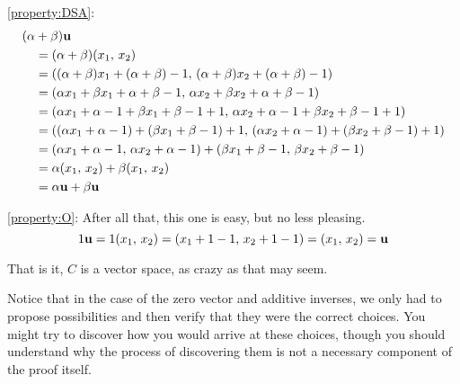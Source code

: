 \documentclass{ximera}
\begin{document}
\begin{example}
\ref{property:DSA}:
\begin{align*}
(\alpha&+\beta)\mathbf{u}\\
&=(\alpha+\beta)(x_1,\,x_2)\\
&=((\alpha+\beta)x_1+(\alpha+\beta)-1,\,(\alpha+\beta)x_2+(\alpha+\beta)-1)\\
&=(\alpha x_1+\beta x_1+\alpha+\beta-1,\,\alpha x_2+\beta x_2+\alpha+\beta-1)\\
&=(\alpha x_1+\alpha-1+\beta x_1+\beta-1+1,\,\alpha x_2+\alpha-1+\beta x_2+\beta-1+1)\\
&=((\alpha x_1+\alpha-1)+(\beta x_1+\beta-1)+1,\,(\alpha x_2+\alpha-1)+(\beta x_2+\beta-1)+1)\\
&=(\alpha x_1+\alpha-1,\,\alpha x_2+\alpha-1)+(\beta x_1+\beta-1,\,\beta x_2+\beta-1)\\
&=\alpha(x_1,\,x_2)+\beta(x_1,\,x_2)\\
&=\alpha\mathbf{u}+\beta\mathbf{u}
\end{align*}




\ref{property:O}:  After all that, this one is easy, but no less pleasing.
\[
1\mathbf{u}=1(x_1,\,x_2)=(x_1+1-1,\,x_2+1-1)=(x_1,\,x_2)=\mathbf{u}
\]




That is it, $C$ is a vector space, as crazy as that may seem.



Notice that in the case of the zero vector and additive inverses, we only had to propose possibilities and then verify that they were the correct choices.  You might try to discover how you would arrive at these choices, though you should understand why the process of discovering them is not a necessary component of the proof itself.



\end{example}
\end{document}
